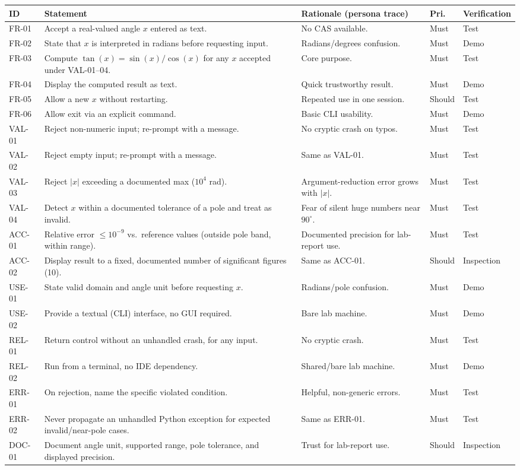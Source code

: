 \documentclass[11pt]{article}
\begin{document}
\begin{longtable}{L{1.3cm}L{6.7cm}L{4.3cm}L{1cm}L{1.9cm}}
\toprule
\textbf{ID} & \textbf{Statement} & \textbf{Rationale (persona trace)} & \textbf{Pri.} & \textbf{Verification} \\
\midrule
\endhead
FR-01 & Accept a real-valued angle $x$ entered as text. & No CAS available. & Must & Test \\
FR-02 & State that $x$ is interpreted in radians before requesting input. & Radians/degrees confusion. & Must & Demo \\
FR-03 & Compute $\tan(x)=\sin(x)/\cos(x)$ for any $x$ accepted under VAL-01--04. & Core purpose. & Must & Test \\
FR-04 & Display the computed result as text. & Quick trustworthy result. & Must & Demo \\
FR-05 & Allow a new $x$ without restarting. & Repeated use in one session. & Should & Test \\
FR-06 & Allow exit via an explicit command. & Basic CLI usability. & Must & Demo \\
VAL-01 & Reject non-numeric input; re-prompt with a message. & No cryptic crash on typos. & Must & Test \\
VAL-02 & Reject empty input; re-prompt with a message. & Same as VAL-01. & Must & Test \\
VAL-03 & Reject $|x|$ exceeding a documented max ($10^4$ rad). & Argument-reduction error grows with $|x|$. & Must & Test \\
VAL-04 & Detect $x$ within a documented tolerance of a pole and treat as invalid. & Fear of silent huge numbers near $90^\circ$. & Must & Test \\
ACC-01 & Relative error $\le 10^{-9}$ vs.\ reference values (outside pole band, within range). & Documented precision for lab-report use. & Must & Test \\
ACC-02 & Display result to a fixed, documented number of significant figures (10). & Same as ACC-01. & Should & Inspection \\
USE-01 & State valid domain and angle unit before requesting $x$. & Radians/pole confusion. & Must & Demo \\
USE-02 & Provide a textual (CLI) interface, no GUI required. & Bare lab machine. & Must & Demo \\
REL-01 & Return control without an unhandled crash, for any input. & No cryptic crash. & Must & Test \\
REL-02 & Run from a terminal, no IDE dependency. & Shared/bare lab machine. & Must & Demo \\
ERR-01 & On rejection, name the specific violated condition. & Helpful, non-generic errors. & Must & Test \\
ERR-02 & Never propagate an unhandled Python exception for expected invalid/near-pole cases. & Same as ERR-01. & Must & Test \\
DOC-01 & Document angle unit, supported range, pole tolerance, and displayed precision. & Trust for lab-report use. & Should & Inspection \\
\bottomrule
\end{longtable}
\end{document}
